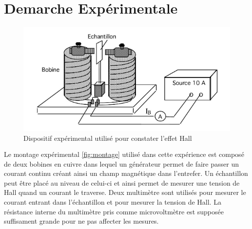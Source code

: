 \section{Demarche Expérimentale}


\begin{minipage}{\textwidth}
    \begin{figure}
        \centering
        \includegraphics[width=\linewidth]{figures/montage.png}
        \caption{Dispositif expérimental utilisé pour constater l'effet Hall \cite{notice}}
        \label{fig:montage}
        \vspace*{1cm}
    \end{figure}

    Le montage expérimental \autoref{fig:montage} utilisé dans cette expérience est composé de deux bobines en cuivre dans lequel un générateur permet de faire passer un courant continu créant ainsi un champ magnétique dans l'entrefer. Un échantillon peut être placé au niveau de celui-ci et ainsi permet de mesurer une tension de Hall quand un courant le traverse. Deux multimètre sont utilisés pour mesurer le courant entrant dans l'échantillon et pour mesurer la tension de Hall. La résistance interne du multimètre pris comme microvoltmètre est supposée suffisament grande pour ne pas affecter les mesures.
\end{minipage}


